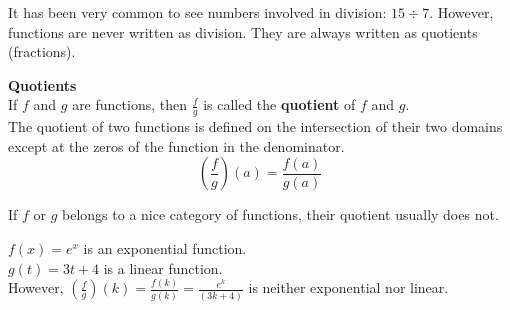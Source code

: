 \documentclass{ximera}
\begin{document}
It has been very common to see numbers involved in division: $15 \div 7$. However, functions are never written as division. They are always written as quotients (fractions).




\begin{template}  \textbf{\textcolor{blue!55!black}{Quotients}} \\


If  $f$ and $g$ are functions, then $\frac{f}{g}$ is called the \textbf{\textcolor{green!50!black}{quotient}} of $f$ and $g$. \\

The quotient of two functions is defined on the intersection of their two domains except at the zeros of the function in the denominator. \\


\[ \left(\frac{f}{g}\right)(a) = \frac{f(a)}{g(a)}  \]



\end{template}



\begin{warning}

If $f$ or $g$ belongs to a nice category of functions, their quotient usually does not.

\end{warning}





\begin{example}

$f(x) = e^x$ is an exponential function. \\
$g(t) = 3 t + 4$ is a linear function. \\

However, $\left(\frac{f}{g}\right)(k) = \frac{f(k)}{g(k)} = \frac{e^k}{(3 k + 4)}$ is neither exponential nor linear.

\end{example}
\end{document}
